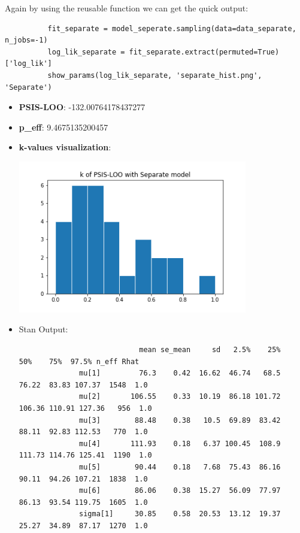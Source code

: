 \documentclass[11pt,a4paper,english]{article}
\begin{document}
        Again by using the reusable function we can get the quick output:
        \begin{verbatim}
          fit_separate = model_seperate.sampling(data=data_separate, n_jobs=-1)
          log_lik_separate = fit_separate.extract(permuted=True)['log_lik']
          show_params(log_lik_separate, 'separate_hist.png', 'Separate')
        \end{verbatim}

        \begin{itemize}
         \item \textbf{PSIS-LOO}: -132.00764178437277
         \item \textbf{p\_eff}: 9.4675135200457
          \item \textbf{k-values visualization}:
            \begin{center}
              \includegraphics[width=10cm]{separate_hist.png}
            \end{center}
          \item Stan Output:
            \begin{verbatim}
                            mean se_mean     sd   2.5%    25%    50%    75%  97.5% n_eff Rhat
              mu[1]         76.3    0.42  16.62  46.74   68.5  76.22  83.83 107.37  1548  1.0
              mu[2]       106.55    0.33  10.19  86.18 101.72 106.36 110.91 127.36   956  1.0
              mu[3]        88.48    0.38   10.5  69.89  83.42  88.11  92.83 112.53   770  1.0
              mu[4]       111.93    0.18   6.37 100.45  108.9 111.73 114.76 125.41  1190  1.0
              mu[5]        90.44    0.18   7.68  75.43  86.16  90.11  94.26 107.21  1838  1.0
              mu[6]        86.06    0.38  15.27  56.09  77.97  86.13  93.54 119.75  1605  1.0
              sigma[1]     30.85    0.58  20.53  13.12  19.37  25.27  34.89  87.17  1270  1.0

\end{verbatim}
\end{itemize}
\end{document}
